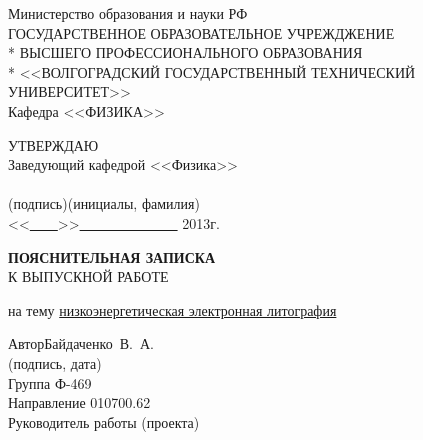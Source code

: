 \begin{titlepage}
\begin{center}
Министерство образования и науки РФ \\
\vspace{.5cm}
ГОСУДАРСТВЕННОЕ ОБРАЗОВАТЕЛЬНОЕ УЧРЕЖДЖЕНИЕ\\*
ВЫСШЕГО ПРОФЕССИОНАЛЬНОГО ОБРАЗОВАНИЯ\\*
<<ВОЛГОГРАДСКИЙ ГОСУДАРСТВЕННЫЙ ТЕХНИЧЕСКИЙ УНИВЕРСИТЕТ>>\\
\vspace{.5cm}
Кафедра <<ФИЗИКА>>
\vspace{.5cm}
\end{center}
\begin{flushright}
УТВЕРЖДАЮ\\
Заведующий кафедрой <<Физика>>\\
\vspace{.3cm}
\underline{\hspace{2cm}}\hspace{1cm}\underline{\hspace{4cm}}\\
\vspace{-.2cm}\footnotesize(подпись)\hspace{1.8cm}(инициалы, фамилия)\hspace*{.2cm}\ \normalsize\\
\vspace{.3cm}
<<\underline{\ \ \ \ }>>\underline{\ \ \ \ \ \ \ \ \ \ \ \ \ \ } 2013г.
\end{flushright}
\begin{center}
\LARGE \textbf{ПОЯСНИТЕЛЬНАЯ ЗАПИСКА} \\
\large К ВЫПУСКНОЙ РАБОТЕ
\end{center}
\begin{center}
на тему \underline{низкоэнергетическая электронная литография}
\end{center}
\begin{flushleft}
Автор\hspace{.7cm}Байдаченко~В.~А.\hfill\underline{\hspace{5cm}}\\
\vspace{-.2cm}\hspace{14cm}\footnotesize(подпись, дата)\normalsize\\
\vspace{-.5cm}
Группа Ф-469\\
Направление 010700.62\\
Руководитель работы (проекта)\\

\end{flushleft}
\end{titlepage}
